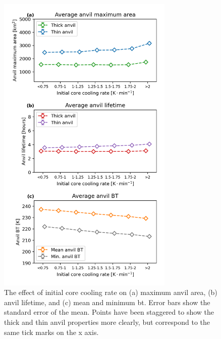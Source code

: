 \begin{figure}[tp]
    \centering
    \includegraphics[width=0.75\textwidth]{figures/chapter3_06.png}
    \caption[
    The effect of initial core cooling rate on maximum anvil area, anvil lifetime, and mean and minimum \acrshort{bt}
    ]{
    The effect of initial core cooling rate on (a) maximum anvil area, (b) anvil lifetime, and (c) mean and minimum \acrshort{bt}. Error bars show the standard error of the mean. Points have been staggered to show the thick and thin anvil properties more clearly, but correspond to the same tick marks on the x axis.
    }
    \label{fig:anvil_cooling_rate_properties}
\end{figure}

